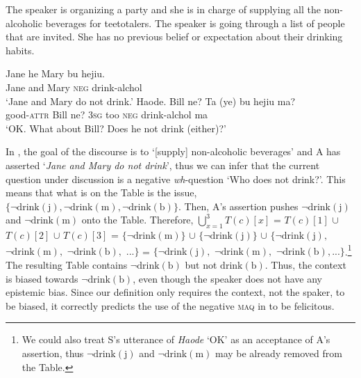 \documentclass[output=paper,colorlinks,citecolor=brown]{langscibook}
\begin{document}
\ea\label{notdrink}The speaker is organizing a party and she is in charge
of supplying all the non-alcoholic beverages for teetotalers.
The speaker is going through a list of people that are invited.
She has no previous belief or expectation about their drinking
habits.
\begin{xlist}
 \gll Jane he Mary bu hejiu. \\
Jane and Mary \textsc{neg} drink-alchol \\
\glt  `Jane and Mary do not drink.'
  \gll Haode. Bill ne? Ta (ye) bu hejiu ma?\\
 good-\textsc{attr} Bill ne? \textsc{3sg} too \textsc{neg} drink-alchol ma \\
\glt `OK. What about Bill? Does he not drink (either)?' 
\end{xlist}
\z

In , the goal of the discourse is to `[supply] non-alcoholic beverages' and A has asserted `\textit{Jane and Mary do not drink}', thus we can infer that the current question under discussion is a negative \textit{wh}-question `Who does not drink?'. This means that what is on the Table is the issue, $ \{\neg \mathrm{drink}(\mathrm{j}), \neg \mathrm{drink}(\mathrm{m}), \neg \mathrm{drink}(\mathrm{b})\} $.  Then, A's assertion pushes $\neg \mathrm{drink}(\mathrm{j})$ and $\neg \mathrm{drink}(\mathrm{m})$ onto the Table.  Therefore, $\bigcup_{x=1}^{3}{T}({c})[x]$ = ${T}({c})[1] $ $\cup$ $ {T}({c})[2] $ $\cup$ $ {T}({c})[3] $ = $\{\neg\mathrm{drink}(\mathrm{m})\} $ $\cup$ $\{\neg \mathrm{drink}(\mathrm{j})\}$ $\cup$ \linebreak $\{\neg\mathrm{drink}(\mathrm{j}),$ $\neg \mathrm{drink}(\mathrm{m}),$ $\neg \mathrm{drink}(\mathrm{b}),$ $...\} $ = $ \{\neg \mathrm{drink}(\mathrm{j}),$ $\neg \mathrm{drink}(\mathrm{m}),$ $\neg \mathrm{drink}(\mathrm{b}), ...\} $.\footnote{We could also treat  S's utterance of \emph{Haode} `OK' as an acceptance of A's assertion, thus  $\neg \mathrm{drink}(\mathrm{j})$ and $\neg \mathrm{drink}(\mathrm{m})$ may be already removed from the Table.}   The resulting Table contains $\neg \mathrm{drink}(\mathrm{b})$ but not  $\mathrm{drink}(\mathrm{b})$.  Thus, the context is biased towards $\neg \mathrm{drink}(\mathrm{b})$, even though the speaker does not have any epistemic bias.  Since our definition only requires the context, not the spaker, to be biased, it correctly predicts  the use of  the negative \textsc{maq} in  to be felicitous.
\end{document}
